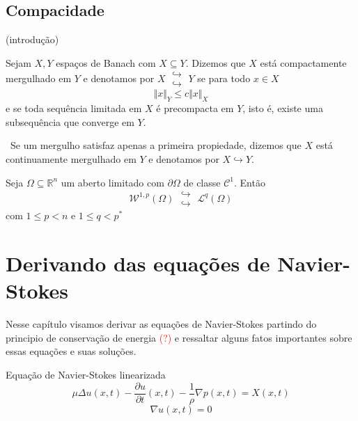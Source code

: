 \documentclass[a4paper, 11pt]{book}
\theoremstyle{definition}
\newcommand{\obs}{\noindent{\textbf{\textcolor{black}{\sffamily Observação:}}}~}
\newcommand{\bR}{\mathbb{R}}
\newcommand{\cC}{\mathcal{C}}
\newcommand{\cL}{\mathcal{L}}
\newcommand{\cW}{\mathcal{W}}
\newcommand{\doublehookrightarrow}{\;\substack{\hookrightarrow \\ \hookrightarrow}\;}
\begin{document}
\section{Compacidade}

(introdução)

\begin{dbox}
    Sejam $X, Y$ espaços de Banach com $X \subseteq Y$. Dizemos que $X$ está compactamente mergulhado em $Y$ e denotamos por $X \doublehookrightarrow Y$
    se para todo $x \in X$
    \[
        \Vert x \Vert_{Y} \leqslant c \Vert x \Vert_X
    \]
    e se toda sequência limitada em $X$ é precompacta em $Y$, isto é, existe uma subsequência que converge em $Y$.
\end{dbox}

\obs Se um mergulho satisfaz apenas a primeira propiedade, dizemos que $X$ está continuamente mergulhado em $Y$ e denotamos por $X \hookrightarrow Y$.

\begin{tbox}
    Seja $\Omega \subseteq \bR^n$ um aberto limitado com $\partial \Omega$ de classe $\cC^1$.
    Então
    \[
        \cW^{1,p}(\Omega) \doublehookrightarrow \cL^q(\Omega)
    \]
    com $1 \leqslant p < n$ e $1 \leqslant q < p^*$
\end{tbox}
\begin{prf}
    
\end{prf}

\chapter{Derivando das equações de Navier-Stokes}

Nesse capítulo visamos derivar as equações de Navier-Stokes partindo do principio de conservação de energia \textcolor{red}{(?)} e ressaltar alguns fatos importantes sobre essas equações e suas soluções.

Equação de Navier-Stokes linearizada
\[
    \mu \Delta u(x,t) - \dfrac{\partial u}{\partial t}(x,t) - \frac{1}{\rho} \nabla p(x,t)  = X(x,t)
\]
\[
    \nabla u(x,t) = 0
\]

\nocite{*}
\printbibliography
\end{document}
